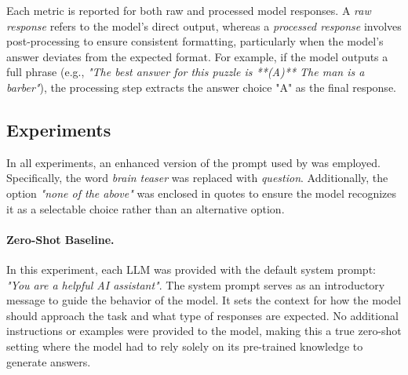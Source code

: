 Each metric is reported for both raw and processed model responses. A \textit{raw response} refers to the model's direct output, whereas a \textit{processed response} involves post-processing to ensure consistent formatting, particularly when the model's answer deviates from the expected format. For example, if the model outputs a full phrase (e.g., \textit{"The best answer for this puzzle is **(A)** The man is a barber"}), the processing step extracts the answer choice "A" as the final response.

\subsection{Experiments}

In all experiments, an enhanced version of the prompt used by \textcite{jiangBRAINTEASERLateralThinking2023} was employed. Specifically, the word \textit{brain teaser} was replaced with \textit{question}. Additionally, the option \textit{"none of the above"} was enclosed in quotes to ensure the model recognizes it as a selectable choice rather than an alternative option.



\paragraph{Zero-Shot Baseline.}
In this experiment, each \ac{LLM} was provided with the default system prompt: \textit{"You are a helpful AI assistant"}. The system prompt serves as an introductory message to guide the behavior of the model. It sets the context for how the model should approach the task and what type of responses are expected. No additional instructions or examples were provided to the model, making this a true zero-shot setting where the model had to rely solely on its pre-trained knowledge to generate answers.


